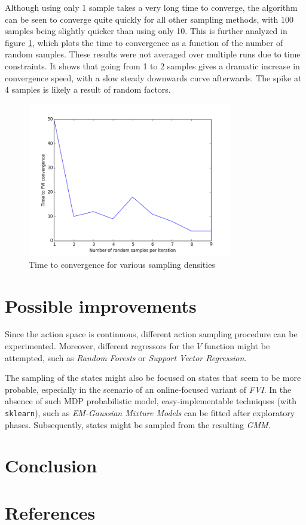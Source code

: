 \documentclass[a4paper, 12pt]{article}
\begin{document}
Although using only 1 sample takes a very long time to converge, the algorithm
can be seen to converge quite quickly for all other sampling methods, with 100
samples being slightly quicker than using only 10. This is further analyzed in
figure \ref{fig:n}, which plots the time to convergence as a function of the
number of random samples. These results were not averaged over multiple runs due
to time constraints. It shows that going from 1 to 2 samples gives a dramatic
increase in convergence speed, with a slow steady downwards curve afterwards.
The spike at 4 samples is likely a result of random factors.

\begin{figure}[htb]
  \centering
  \includegraphics[width=0.8\textwidth]{n_samples.png}
  \caption{Time to convergence for various sampling densities}
  \label{fig:n}
\end{figure}

\FloatBarrier

\section*{Possible improvements}

Since the action space is continuous, different action sampling procedure
can be experimented. Moreover, different regressors for the 
$V$ function might be attempted,
such as \emph{Random Forests} or \emph{Support Vector Regression}.

The sampling of the states might also be focused on states that 
seem to be more probable, especially in the scenario of 
an online-focused variant
of \emph{FVI}. In the absence of such MDP probabilistic model,
easy-implementable techniques (with \texttt{sklearn}), such as
\emph{EM-Gaussian Mixture Models} can be fitted
after exploratory phases. Subsequently,
states might be sampled from the resulting \emph{GMM}.

\section*{Conclusion}

\section*{References}


\end{document}
